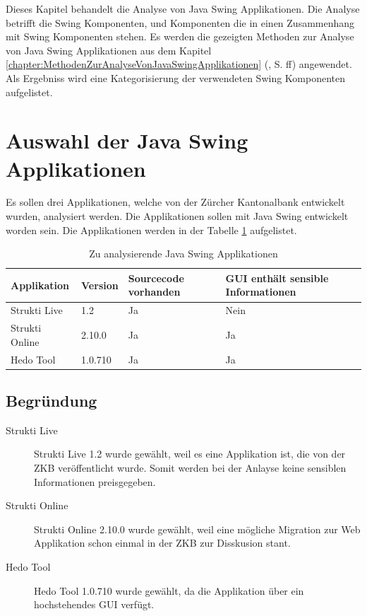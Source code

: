   Dieses Kapitel behandelt die Analyse von Java Swing Applikationen. Die
  Analyse betrifft die Swing Komponenten, und Komponenten die in einen
  Zusammenhang mit Swing Komponenten stehen. Es werden die gezeigten
  Methoden zur Analyse von Java Swing Applikationen aus dem Kapitel 
  \ref{chapter:MethodenZurAnalyseVonJavaSwingApplikationen}
  (, S.
  \pageref{chapter:MethodenZurAnalyseVonJavaSwingApplikationen}ff) angewendet.
  Als Ergebniss wird eine Kategorisierung der verwendeten Swing Komponenten
  aufgelistet.
  
  \section{Auswahl der Java Swing Applikationen}
  
  Es sollen drei Applikationen, welche von der Zürcher Kantonalbank entwickelt
  wurden, analysiert werden. Die Applikationen sollen mit Java Swing entwickelt
  worden sein. Die Applikationen werden in der Tabelle
  \ref{tab:zuAnalysierendeJavaSwingApplikationen} aufgelistet.
  \newline
  
  \begin{table}[ht]
    \sffamily 
    \begin{center}
      \begin{tabular}{llp{2cm}p{3.5cm}}
        \toprule
        Applikation & Version & Sourcecode vorhanden & GUI enthält sensible
        Informationen\\
        \midrule
        Strukti Live & 1.2 & Ja & Nein\\
        Strukti Online & 2.10.0 & Ja & Ja\\
        Hedo Tool & 1.0.710 & Ja & Ja\\
        \bottomrule
      \end{tabular}
      \caption{Zu analysierende Java Swing Applikationen}
      \label{tab:zuAnalysierendeJavaSwingApplikationen}
    \end{center}
  \end{table}
  
  \subsection{Begründung}
  
  \begin{description}
  \item[Strukti Live]
  Strukti Live 1.2 wurde gewählt, weil es eine Applikation ist, die
  von der ZKB veröffentlicht wurde. Somit werden bei der Anlayse keine
  sensiblen Informationen preisgegeben.
  \item[Strukti Online]
  Strukti Online 2.10.0 wurde gewählt, weil eine mögliche Migration
  zur Web Applikation schon einmal in der \ac{ZKB} zur Disskusion stant.
  \item[Hedo Tool]
  Hedo Tool 1.0.710 wurde gewählt, da die Applikation über ein hochstehendes
  \ac{GUI} verfügt.
  \end{description}
  
